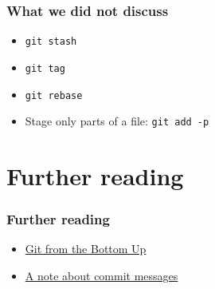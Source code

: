 \documentclass{gittalk}
\newcommand{\hlcommand}[1]{ %
\colorbox{base3}{\small \texttt{#1}}
}
\begin{document}
\begin{frame}
\frametitle{What we did not discuss}
\begin{itemize}
  \item \hlcommand{git stash}
  \item \hlcommand{git tag}
  \item \hlcommand{git rebase}
  \item Stage only parts of a file: \texttt{git add -p}
\end{itemize}
\end{frame}

\section{Further reading}

\begin{frame}
\frametitle{Further reading}
\begin{itemize}
    \item \href{http://jwiegley.github.io/git-from-the-bottom-up/}{Git from the Bottom Up}
    \item \href{http://tbaggery.com/2008/04/19/a-note-about-git-commit-messages.html}
               {A note about commit messages}
\end{itemize}
\end{frame}
\end{document}
